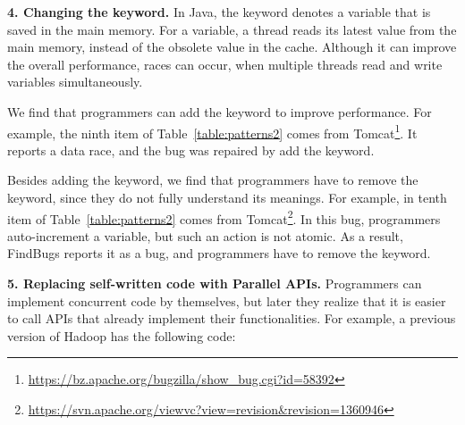 


\noindent
\textbf{4. Changing the  keyword.} In Java, the  keyword denotes a variable that is saved in the main memory. For a  variable, a thread reads its latest value from the main memory, instead of the obsolete  value in the cache. Although it can improve the overall performance, races can occur, when multiple threads read and write  variables simultaneously.

We find that programmers can add the  keyword to improve performance. For example, the ninth item of Table~\ref{table:patterns2} comes from Tomcat\footnote{\url{https://bz.apache.org/bugzilla/show_bug.cgi?id=58392}}. It reports a data race, and the bug was repaired by add the  keyword.


Besides adding the keyword, we find that programmers have to remove the  keyword, since they do not fully understand its meanings. For example, in tenth item of Table~\ref{table:patterns2} comes from Tomcat\footnote{\url{https://svn.apache.org/viewvc?view=revision&revision=1360946}}. In this bug, programmers auto-increment a  variable, but such an action is not atomic. As a result, FindBugs reports it as a bug, and programmers have to remove the keyword.

\noindent
\textbf{5. Replacing self-written code with Parallel APIs.} Programmers can implement concurrent code by themselves, but later they realize that it is easier to call APIs that already implement their functionalities. For example, a previous version of Hadoop has the following code:%

%

